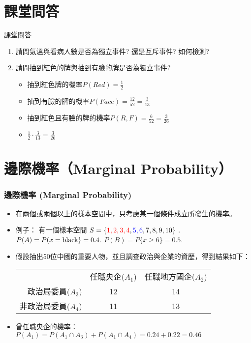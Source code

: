 \documentclass{beamer}
\begin{document}
\section{課堂問答}
\begin{frame}{課堂問答}
\begin{enumerate}
\item 請問氣溫與看病人數是否為獨立事件? 還是互斥事件? 如何檢測?
\item 請問抽到紅色的牌與抽到有臉的牌是否為獨立事件?\pause
\begin{itemize}
\item 抽到紅色牌的機率$P(Red)=\frac{1}{2}$ \pause
\item 抽到有臉的牌的機率$P(Face)=\frac{12}{52}=\frac{3}{13}$ \pause
\item 抽到紅色且有臉的牌的機率$P(R,F)=\frac{6}{52}=\frac{3}{26}$\pause
\item $\frac{1}{2}\cdot\frac{3}{13}=\frac{3}{26}$
\end{itemize}
\end{enumerate}
\end{frame}

\section{邊際機率（Marginal Probability）}
\begin{frame}\frametitle{邊際機率 (Marginal Probability)}
\begin{itemize}
\item 在兩個或兩個以上的樣本空間中，只考慮某一個條件成立所發生的機率。
\item 例子： 有一個樣本空間 $S=\{\textcolor{red}{1,2,3,4}, \textcolor{blue}{5,6},7,8,9,10\}$ . $P(A)=P(x={\rm black}\}=0.4$. $P(B)=P\{x\geq 6\}=0.5$.\\
\vspace{1cm}
\item 假設抽出50位中國的重要人物，並且調查政治與企業的資歷，得到結果如下：
\begin{table}[ht]
\begin{tabular}{ r | c | c | }
\multicolumn{1}{r}{}
 &  \multicolumn{1}{c}{任職央企($A_{1}$)}
 & \multicolumn{1}{c}{任職地方國企($A_{2}$)} \\
\cline{2-3}
 政治局委員($A_{3}$) & 12 & 14 \\
\cline{2-3}
 非政治局委員($A_{4}$) & 11 & 13 \\
\cline{2-3}
\end{tabular}
\end{table}
\item 曾任職央企的機率：$P(A_{1})=P(A_{1}\cap A_{3}) + P(A_{1}\cap A_{4}) = 0.24 + 0.22 = 0.46$
\end{itemize}
\end{frame}
\end{document}
